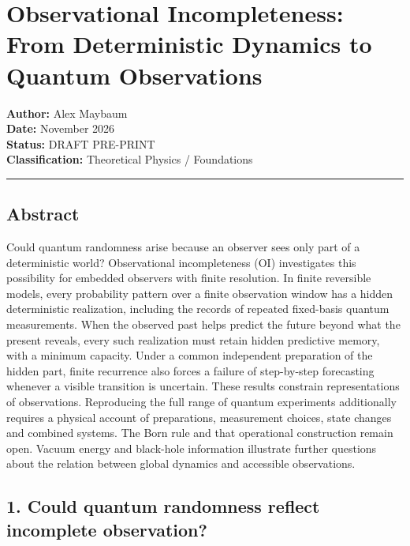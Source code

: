 \documentclass[
]{article}
\author{}
\date{}
\begin{document}
\hypertarget{observational-incompleteness-from-deterministic-dynamics-to-quantum-observations}{%
\section{Observational Incompleteness: From Deterministic Dynamics to
Quantum
Observations}\label{observational-incompleteness-from-deterministic-dynamics-to-quantum-observations}}

\textbf{Author:} Alex Maybaum\\
\textbf{Date:} November 2026\\
\textbf{Status:} DRAFT PRE-PRINT\\
\textbf{Classification:} Theoretical Physics / Foundations

\begin{center}\rule{0.5\linewidth}{0.5pt}\end{center}

\hypertarget{abstract}{%
\subsection{Abstract}\label{abstract}}

Could quantum randomness arise because an observer sees only part of a
deterministic world? Observational incompleteness (OI) investigates this
possibility for embedded observers with finite resolution. In finite
reversible models, every probability pattern over a finite observation
window has a hidden deterministic realization, including the records of
repeated fixed-basis quantum measurements. When the observed past helps
predict the future beyond what the present reveals, every such
realization must retain hidden predictive memory, with a minimum
capacity. Under a common independent preparation of the hidden part,
finite recurrence also forces a failure of step-by-step forecasting
whenever a visible transition is uncertain. These results constrain
representations of observations. Reproducing the full range of quantum
experiments additionally requires a physical account of preparations,
measurement choices, state changes and combined systems. The Born rule
and that operational construction remain open. Vacuum energy and
black-hole information illustrate further questions about the relation
between global dynamics and accessible observations.

\hypertarget{could-quantum-randomness-reflect-incomplete-observation}{%
\subsection{1. Could quantum randomness reflect incomplete
observation?}\label{could-quantum-randomness-reflect-incomplete-observation}}
\end{document}
